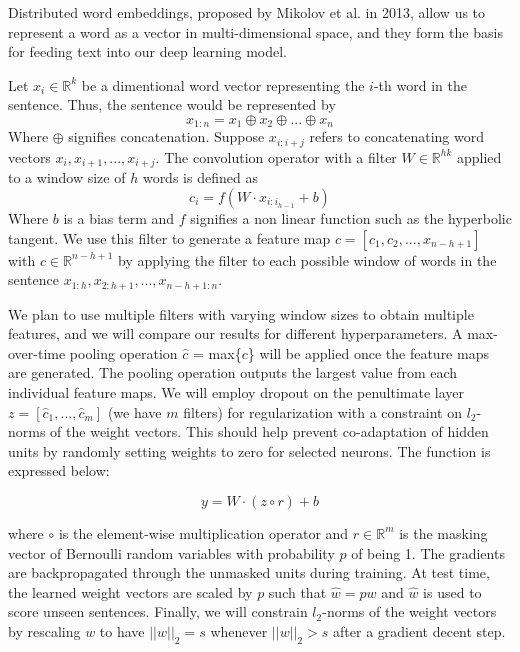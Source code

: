 \documentclass[conference]{IEEEtran}
\begin{document}
    Distributed word embeddings, proposed by Mikolov et al.
    in 2013\cite{word2vec}, allow us to represent a word as a vector in
    multi-dimensional space, and they form the basis for feeding text into our deep
    learning model.

    Let $x_{i} \in \mathbb{R}^k$ be a dimentional word vector representing the $i$-th word in the
    sentence. Thus, the sentence would be represented by
    \begin{equation}
    x_{1:n} = x_1 \oplus x_2 \oplus ... \oplus x_n
    \end{equation}
    Where $\oplus$ signifies concatenation. Suppose $x_{i:i+j}$ refers to concatenating
    word vectors $x_i, x_{i+1}, ... , x_{i+j}$. The convolution operator with a filter
    $W \in \mathbb{R}^{hk}$ applied to a window size of $h$
    words is defined as
    \begin{equation}
    c_i = f(W \cdot x_{i:i_{h-1}} + b)
    \end{equation}
    Where $b$ is a bias term and $f$ signifies a non linear function such as the hyperbolic
    tangent. We use this filter to generate a feature map $c = [c_1, c_2, ... ,x_{n-h+1}]$
    with $c \in \mathbb{R}^{n-h+1}$ by applying the filter to each possible window of words in
    the sentence $x_{1:h}, x_{2:h+1}, ... ,x_{n-h+1:n}$.

    We plan to use multiple filters with varying window sizes to obtain multiple features, and we will
    compare our results for different hyperparameters.
    A max-over-time pooling operation $\hat{c}$ = max\{$c$\} will be applied once the feature
    maps are generated. The pooling operation outputs the largest value from each individual
    feature maps. We will employ dropout on the penultimate layer $z = [\hat{c}_1,...,\hat{c}_m]$
    (we have $m$ filters) for regularization with a constraint on $l_2$-norms of the weight
    vectors. This should help prevent co-adaptation of hidden units by randomly setting weights
    to zero for selected neurons. The function is expressed below:

    \begin{equation}
    y = W \cdot (z \circ r) + b
    \end{equation}

    where $\circ$ is the element-wise multiplication operator and $r \in \mathbb{R}^m$ is
    the masking vector of Bernoulli random variables with probability $p$ of being 1.
    The gradients are backpropagated through the unmasked units during training. At test
    time, the learned weight vectors are scaled by $p$ such that $\hat{w} = pw$ and $\hat{w}$
    is used to score unseen sentences. Finally, we will constrain $l_2$-norms of the weight
    vectors by rescaling $w$ to have $||w||_2 = s$ whenever $||w||_2 > s$ after a gradient
    decent step.
\end{document}
